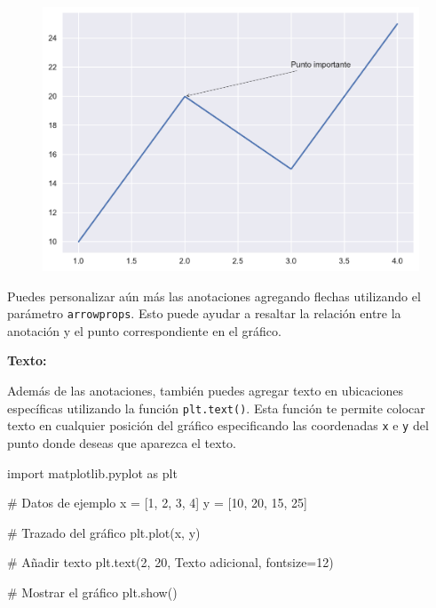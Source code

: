 \documentclass[
  a4paper,
]{article}
\newenvironment{Shaded}{}{}
\newcommand{\CommentTok}[1]{\textcolor[rgb]{0.42,0.45,0.49}{#1}}
\newcommand{\DecValTok}[1]{\textcolor[rgb]{0.00,0.36,0.77}{#1}}
\newcommand{\ImportTok}[1]{\textcolor[rgb]{0.01,0.18,0.38}{#1}}
\newcommand{\NormalTok}[1]{\textcolor[rgb]{0.14,0.16,0.18}{#1}}
\newcommand{\OperatorTok}[1]{\textcolor[rgb]{0.14,0.16,0.18}{#1}}
\newcommand{\StringTok}[1]{\textcolor[rgb]{0.01,0.18,0.38}{#1}}
\begin{document}
\begin{figure}[H]

{\centering \includegraphics{index_files/figure-pdf/cell-13-output-1.pdf}

}

\end{figure}

Puedes personalizar aún más las anotaciones agregando flechas utilizando
el parámetro \texttt{arrowprops}. Esto puede ayudar a resaltar la
relación entre la anotación y el punto correspondiente en el gráfico.

\textbf{Texto:}

Además de las anotaciones, también puedes agregar texto en ubicaciones
específicas utilizando la función \texttt{plt.text()}. Esta función te
permite colocar texto en cualquier posición del gráfico especificando
las coordenadas \texttt{x} e \texttt{y} del punto donde deseas que
aparezca el texto.

\begin{Shaded}
\begin{Highlighting}[]
\ImportTok{import}\NormalTok{ matplotlib.pyplot }\ImportTok{as}\NormalTok{ plt}

\CommentTok{\# Datos de ejemplo}
\NormalTok{x }\OperatorTok{=}\NormalTok{ [}\DecValTok{1}\NormalTok{, }\DecValTok{2}\NormalTok{, }\DecValTok{3}\NormalTok{, }\DecValTok{4}\NormalTok{]}
\NormalTok{y }\OperatorTok{=}\NormalTok{ [}\DecValTok{10}\NormalTok{, }\DecValTok{20}\NormalTok{, }\DecValTok{15}\NormalTok{, }\DecValTok{25}\NormalTok{]}

\CommentTok{\# Trazado del gráfico}
\NormalTok{plt.plot(x, y)}

\CommentTok{\# Añadir texto}
\NormalTok{plt.text(}\DecValTok{2}\NormalTok{, }\DecValTok{20}\NormalTok{, }\StringTok{\textquotesingle{}Texto adicional\textquotesingle{}}\NormalTok{, fontsize}\OperatorTok{=}\DecValTok{12}\NormalTok{)}

\CommentTok{\# Mostrar el gráfico}
\NormalTok{plt.show()}
\end{Highlighting}
\end{Shaded}
\end{document}
